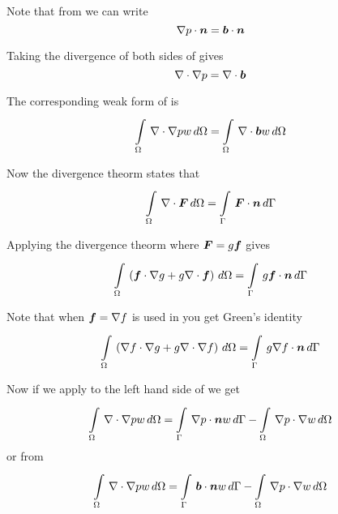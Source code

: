 Note that from  we can write
\begin{equation} 
  \dotprod{\gradient{p}}{\normal}=\dotprod{\vect{b}}{\normal}
  \label{eqn:NavierStokesPressureFormNormal}
\end{equation}

Taking the divergence of both sides of  gives
\begin{equation}
  \diverg{\gradient{p}}=\diverg{\vect{b}}
  \label{eqn:PressurePoisson}
\end{equation}

The corresponding weak form of  is
\begin{equation}
  \gint{\Omega}{}{\diverg{\gradient{p}}w}{\Omega}=\gint{\Omega}{}{\diverg{\vect{b}}w}{\Omega}
  \label{eqn:PressurePoissonWeakForm}
\end{equation}

Now the divergence theorm states that
\begin{equation}
  \gint{\Omega}{}{\diverg{\tensor{F}}}{\Omega}=\gint{\Gamma}{}{\dotprod{\tensor{F}}{\normal}}{\Gamma}
  \label{eqn:DivergenceTheorm}
\end{equation}

Applying the divergence theorm where $\tensor{F}=g\vect{f}$ gives
\begin{equation}
  \gint{\Omega}{}{\pbrac{\dotprod{\vect{f}}{\gradient{g}}+g\diverg{\vect{f}}}}{\Omega}=\gint{\Gamma}{}{g\dotprod{\vect{f}}{\normal}}{\Gamma}
  \label{eqn:DivergenceTheormScalarVector}
\end{equation}

Note that when $\vect{f}=\gradient{f}$ is used in
 you get Green's identity \ie
\begin{equation}
  \gint{\Omega}{}{\pbrac{\dotprod{\gradient{f}}{\gradient{g}}+g\diverg{\gradient{f}}}}{\Omega}=\gint{\Gamma}{}{g\dotprod{\gradient{f}}{\normal}}{\Gamma}
  \label{eqn:GreensIdentity1}
\end{equation}

Now if we apply  to the left hand side of
 we get
\begin{equation}
  \gint{\Omega}{}{\diverg{\gradient{p}}w}{\Omega}=\gint{\Gamma}{}{\dotprod{\gradient{p}}{\normal}w}{\Gamma}-
  \gint{\Omega}{}{\dotprod{\gradient{p}}{\gradient{w}}}{\Omega}
\end{equation}
or from 
\begin{equation}
  \gint{\Omega}{}{\diverg{\gradient{p}}w}{\Omega}=\gint{\Gamma}{}{\dotprod{\vect{b}}{\normal}w}{\Gamma}-
  \gint{\Omega}{}{\dotprod{\gradient{p}}{\gradient{w}}}{\Omega}
  \label{eqn:PressurePoissonWeakFormLHS}
\end{equation}


